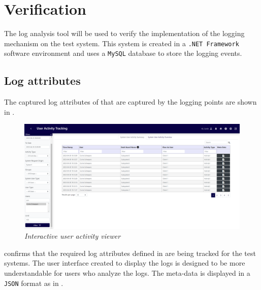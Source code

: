 \section{Verification}\label{sec:ch3_Verification}
The log analysis tool will be used to verify the implementation of the logging mechanism on the test system. This system is created in a \texttt{.NET Framework} software environment and uses a \texttt{MySQL} database to store the logging events.

\subsection{Log attributes}
The captured log attributes of  that are captured by the logging points are shown in .

\begin{figure}[!htb]
	\centering %
	\includegraphics[width=0.99\linewidth]{img/ch3/analysis/UAT_menu.png}
	\caption[Interactive user activity viewer]
	{\textit{Interactive user activity viewer}}\label{fig:ch3_UAT_menu}
\end{figure}

 confirms that the required log attributes defined in  are being tracked for the test systems. The user interface created to display the logs is designed to be more understandable for users who analyze the logs. The meta-data is displayed in a \texttt{JSON} format as in .

\clearpage

